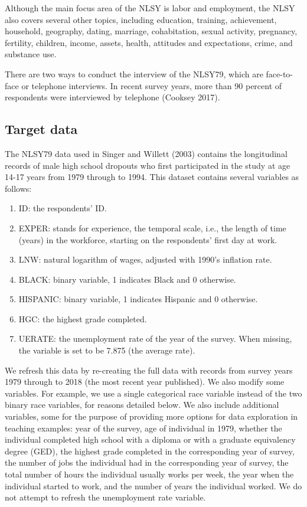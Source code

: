 \documentclass{article}
\providecommand{\tightlist}{%
  \setlength{\itemsep}{0pt}\setlength{\parskip}{0pt}}
\begin{document}
Although the main focus area of the NLSY is labor and employment, the NLSY also covers several other topics, including education, training, achievement, household, geography, dating, marriage, cohabitation, sexual activity, pregnancy, fertility, children, income, assets, health, attitudes and expectations, crime, and substance use.

There are two ways to conduct the interview of the NLSY79, which are face-to-face or telephone interviews. In recent survey years, more than 90 percent of respondents were interviewed by telephone (Cooksey 2017).

\hypertarget{target}{%
\subsection{Target data}\label{target}}

The NLSY79 data used in Singer and Willett (2003) contains the longitudinal records of male high school dropouts who first participated in the study at age 14-17 years from 1979 through to 1994. This dataset contains several variables as follows:

\begin{enumerate}
\def\labelenumi{\arabic{enumi}.}
\tightlist
\item
  ID: the respondents' ID.
\item
  EXPER: stands for experience, the temporal scale, i.e., the length of time (years) in the workforce, starting on the respondents' first day at work.
\item
  LNW: natural logarithm of wages, adjusted with 1990's inflation rate.
\item
  BLACK: binary variable, 1 indicates Black and 0 otherwise.
\item
  HISPANIC: binary variable, 1 indicates Hispanic and 0 otherwise.
\item
  HGC: the highest grade completed.
\item
  UERATE: the unemployment rate of the year of the survey. When missing, the variable is set to be 7.875 (the average rate).
\end{enumerate}

We refresh this data by re-creating the full data with records from survey years 1979 through to 2018 (the most recent year published). We also modify some variables. For example, we use a single categorical race variable instead of the two binary race variables, for reasons detailed below. We also include additional variables, some for the purpose of providing more options for data exploration in teaching examples: year of the survey, age of individual in 1979, whether the individual completed high school with a diploma or with a graduate equivalency degree (GED), the highest grade completed in the corresponding year of survey, the number of jobs the individual had in the corresponding year of survey, the total number of hours the individual usually works per week, the year when the individual started to work, and the number of years the individual worked. We do not attempt to refresh the unemployment rate variable.
\end{document}
